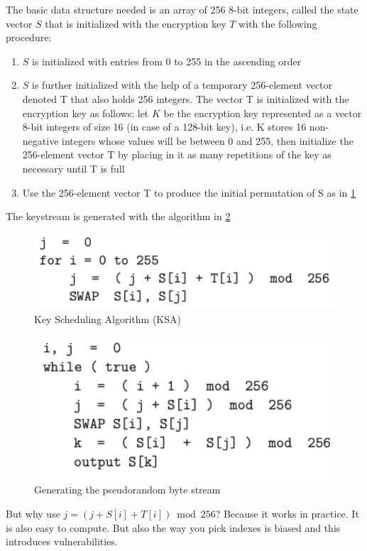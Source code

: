 The basic data structure needed is an array of 256 8-bit integers, called the state vector $S$ that is initialized with the encryption key $T$ with the following procedure:
\begin{enumerate}
	\item $S$ is initialized with entries from 0 to 255 in the ascending order
	\item $S$ is further initialized with the help of a temporary 256-element vector denoted T that also holds 256 integers. The vector T is initialized with the encryption key as follows: let $K$ be the encryption key represented as a vector 8-bit integers of size 16 (in case of a 128-bit key), i.e. K stores 16 non-negative integers whose values will be between 0 and 255, then initialize the 256-element vector T by placing in it as many repetitions of the key as necessary
	until T is full
	\item Use the 256-element vector T to produce the initial permutation of S as in \ref{fig:rc4_ksa}
\end{enumerate}

The keystream is generated with the algorithm in \ref{fig:rc4_keystream}
\begin{figure}
	\centering
	\includegraphics[width=0.7\linewidth]{Images/Chapter2/rc4_ksa}
	\caption{Key Scheduling Algorithm (KSA)}
	\label{fig:rc4_ksa}
\end{figure}

\begin{figure}
	\centering
	\includegraphics[width=0.7\linewidth]{Images/Chapter2/rc4_keystream}
	\caption{Generating the pseudorandom byte stream}
	\label{fig:rc4_keystream}
\end{figure}

But why use $j = (j + S[i] + T[i]) \bmod 256$? Because it works in practice. It is also easy to compute. But also the way you pick indexes is biased and this introduces vulnerabilities.

